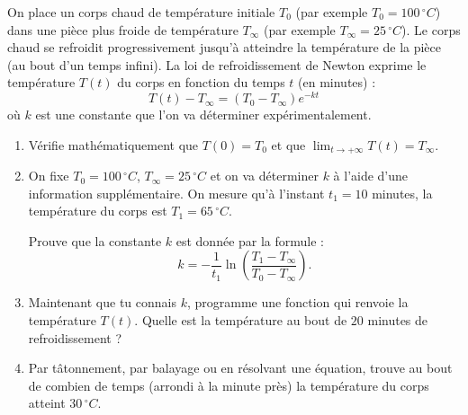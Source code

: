 \documentclass[11pt,class=report,crop=false]{standalone}
\begin{document}
\begin{activite}
  
  On place un corps chaud de température initiale $T_0$ (par exemple $T_0 = 100\,{}^\circ C$) dans une pièce plus froide de température $T_\infty$ (par exemple $T_\infty = 25\,{}^\circ C$). Le corps chaud se refroidit progressivement jusqu'à atteindre la température de la pièce (au bout d'un temps infini). 
  La loi de refroidissement de Newton exprime le température $T(t)$ du corps en fonction du temps $t$ (en minutes) :
  $$T(t) - T_\infty = (T_0 - T_\infty) e^{-kt}$$
  où $k$ est une constante que l'on va déterminer expérimentalement.
  
  
  \begin{enumerate}
    \item Vérifie mathématiquement que $T(0)=T_0$ et que $\lim_{t\to+\infty} T(t) = T_\infty$. 
    
    \item On fixe $T_0 = 100\,{}^\circ C$, $T_\infty = 25\,{}^\circ C$ et on va déterminer $k$ à l'aide d'une information supplémentaire.
    On mesure qu'à l'instant $t_1 = 10$ minutes, la température du corps est $T_1 = 65\,{}^\circ C$.
    
    Prouve que la constante $k$ est donnée par la formule :
    $$k = -\frac{1}{t_1} \ln\left(\frac{T_1-T_\infty}{T_0-T_\infty} \right).$$ 
    
	\item Maintenant que tu connais $k$, programme une fonction  qui renvoie la température $T(t)$.
  Quelle est la température au bout de $20$ minutes de refroidissement ?	
 
     \item Par tâtonnement, par balayage ou en résolvant une équation, trouve au bout de combien de temps (arrondi à la minute près) la température du corps atteint $30\,{}^\circ C$.
         
  \end{enumerate}   

\end{activite}



\end{document}
